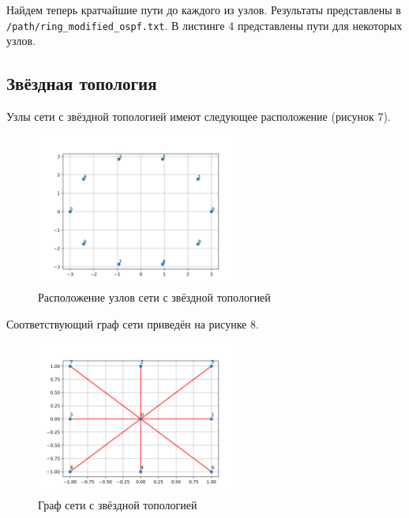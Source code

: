 \documentclass[a4paper,14pt]{extarticle}
\begin{document}
Найдем теперь кратчайшие пути до каждого из узлов. Результаты представлены в \texttt{/path/ring\_modified\_ospf.txt}. В листинге 4 представлены пути для некоторых узлов.



\subsection{Звёздная топология}

Узлы сети с звёздной топологией имеют следующее расположение (рисунок 7).
\clearpage
\begin{figure}[htbp]
    \centering
    \includegraphics[width=0.6\textwidth]{img/ring_points.png}
    \caption{Расположение узлов сети с звёздной топологией}
    \label{fig:hamiltonianGraph}
\end{figure}


Соответствующий граф сети приведён на рисунке 8.

\begin{figure}[htbp]
    \centering
    \includegraphics[width=0.6\textwidth]{img/star_graph.png}
    \caption{Граф сети с звёздной топологией}
    \label{fig:hamiltonianGraph}
\end{figure}
\end{document}
